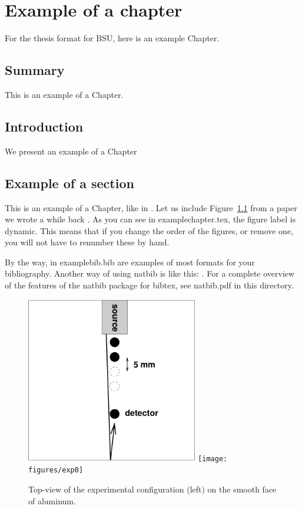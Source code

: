 \chapter{Example of a chapter}
\label{chap:example}

For the thesis format for BSU, here is an example Chapter.

\section{Summary}
 
This is an example of a Chapter. 

\section{Introduction}

We present an example of a Chapter

\section{\nobreak Example of a section}

This is an example of a Chapter, like in \citet{mythesis}. Let us
include Figure~\ref{fig:figure} from a paper we wrote a while back
\citep{scalesvanwijk01}. As you can see in examplechapter.tex, the
figure label is dynamic. This means that if you change the order of
the figures, or remove one, you will not have to renumber these by
hand.

By the way, in examplebib.bib are examples of most formats for your
bibliography. Another way of using natbib is like this: \cite[or][for
example]{mythesis}. For a complete overview of the features of the
natbib package for bibtex, see natbib.pdf in this directory.

\begin{figure}
  \center
  \includegraphics[width=7.5cm]{figures/setup}
  \texttt{[image: figures/exp0]}
  \caption{Top-view of the experimental configuration (left) on the
    smooth face of aluminum.}
  \label{fig:figure}
\end{figure}

